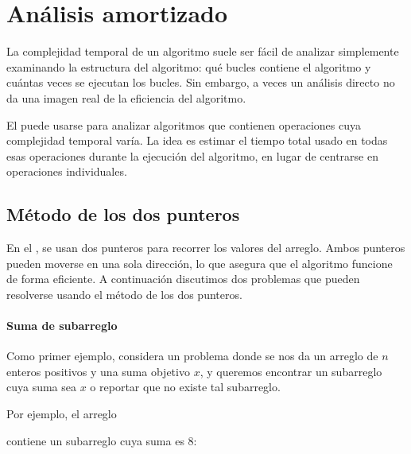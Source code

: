 \chapter{Análisis amortizado}


La complejidad temporal de un algoritmo
suele ser fácil de analizar
simplemente examinando la estructura
del algoritmo:
qué bucles contiene el algoritmo
y cuántas veces se ejecutan los bucles.
Sin embargo, a veces un análisis directo
no da una imagen real de la eficiencia del algoritmo.

El  puede usarse para analizar
algoritmos que contienen operaciones cuya
complejidad temporal varía.
La idea es estimar el tiempo total usado en
todas esas operaciones durante la
ejecución del algoritmo, en lugar de centrarse
en operaciones individuales.

\section{Método de los dos punteros}


En el ,
se usan dos punteros para
recorrer los valores del arreglo.
Ambos punteros pueden moverse en una sola dirección,
lo que asegura que el algoritmo funcione de forma eficiente.
A continuación discutimos dos problemas que pueden resolverse
usando el método de los dos punteros.

\subsubsection{Suma de subarreglo}

Como primer ejemplo,
considera un problema donde se nos
da un arreglo de $n$ enteros positivos
y una suma objetivo $x$,
y queremos encontrar un subarreglo cuya suma sea $x$
o reportar que no existe tal subarreglo.

Por ejemplo, el arreglo
\begin{center}
\end{center}
contiene un subarreglo cuya suma es 8:
\begin{center}
\end{center}

